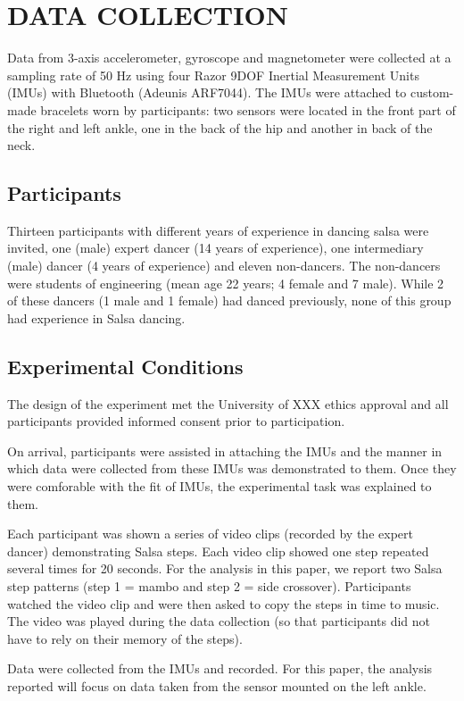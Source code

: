 \documentclass{sigchi}
\begin{document}
\section{DATA COLLECTION}
Data from 3-axis accelerometer, gyroscope and magnetometer were collected at a sampling rate of 50 Hz 
using four Razor 9DOF Inertial Measurement Units (IMUs) with Bluetooth (Adeunis 
ARF7044). 
The IMUs were attached to custom-made bracelets worn by participants: 
two sensors were located in the front part of the right and left ankle, one in the 
back of the hip and another in back of the neck. 


\subsection{Participants}
Thirteen participants with different years of experience in dancing salsa were invited, one (male) 
expert dancer (14 years of experience), one intermediary (male) dancer (4 years of experience) 
and eleven non-dancers. 
The non-dancers were students of engineering (mean age 22 years; 4 female and 7 male).  
While 2 of these dancers (1 male and 1 female) had danced previously, none of this group had experience 
in Salsa dancing.  

\subsection{Experimental Conditions}
The design of the experiment met the University of XXX ethics approval and all participants provided informed 
consent prior to participation.

On arrival, participants were assisted in attaching the IMUs and the manner in which data were collected 
from these IMUs was demonstrated to them.  Once they were comforable with the fit of IMUs, 
the experimental task was explained to them.  

Each participant was shown a series of video clips (recorded by the expert dancer) demonstrating Salsa steps.  
Each video clip showed one step repeated several times for 20 seconds.  For the analysis in this paper, 
we report two Salsa step patterns (step 1 = mambo and step 2 = side crossover).  
Participants watched the video clip and were then asked to copy the steps in time to music.  
The video was played during the data collection 
(so that participants did not have to rely on their memory of the steps).

Data were collected from the IMUs and recorded.  
For this paper, the analysis reported will focus on data taken from the sensor mounted on the left ankle. 
\end{document}
